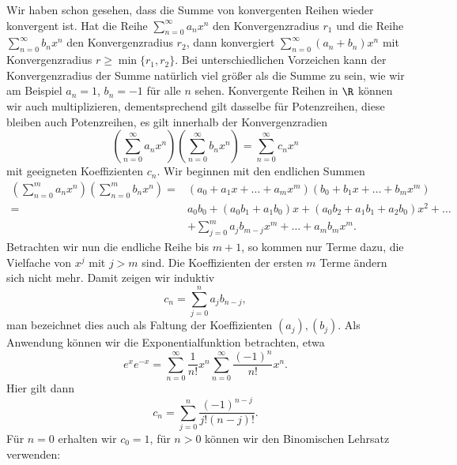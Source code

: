\documentclass[letterpaper,10pt,english]{jupyterBook}
\begin{document}
Wir haben schon gesehen, dass die Summe von konvergenten Reihen wieder konvergent ist. Hat die Reihe \(\sum_{n=0}^\infty a_n x^n\) den Konvergenzradius \(r_1\) und die Reihe  \(\sum_{n=0}^\infty b_n x^n\) den Konvergenzradius \(r_2\), dann konvergiert  \(\sum_{n=0}^\infty (a_n+b_n) x^n\)  mit  Konvergenzradius \(r \geq \min\{r_1,r_2\}.\) Bei unterschiedlichen Vorzeichen kann der Konvergenzradius der Summe natürlich viel größer als die Summe zu sein, wie wir am Beispiel \(a_n = 1\), \(b_n = -1\) für alle \(n\) sehen.
Konvergente Reihen in \(\R\) können wir auch multiplizieren, dementsprechend gilt dasselbe für Potenzreihen, diese bleiben auch Potenzreihen, es gilt innerhalb der Konvergenzradien
\begin{equation*}
 \left( \sum_{n=0}^\infty a_n x^n \right) \left( \sum_{n=0}^\infty b_n x^n \right) = \sum_{n=0}^\infty c_n x^n
\end{equation*}
mit geeigneten Koeffizienten \(c_n\). Wir beginnen mit den endlichen Summen
\begin{align*}\left( \sum_{n=0}^m a_n x^n \right) \left( \sum_{n=0}^m b_n x^n \right) =& (a_0 + a_1x+ \ldots + a_m x^m)(b_0 + b_1x+ \ldots + b_m x^m) \\
=& a_0 b_0 + (a_0b_1+a_1b_0)x + (a_0 b_2 + a_1 b_1 + a_2 b_0)x^2 + \ldots \\ & + \sum_{j=0}^m a_j b_{m-j} x^m + \ldots +a_m b_m x^m .
\end{align*}
Betrachten wir nun die endliche Reihe bis \(m+1\), so kommen nur Terme dazu, die Vielfache von \(x^j\) mit \(j > m\) sind. Die Koeffizienten der ersten \(m\) Terme ändern sich nicht mehr. Damit zeigen wir induktiv
\begin{equation*}
 c_n =  \sum_{j=0}^n a_j b_{n-j}  ,
\end{equation*}
man bezeichnet dies auch als Faltung der Koeffizienten \((a_j), (b_j)\).
Als Anwendung können wir die Exponentialfunktion betrachten, etwa
\begin{equation*}
 e^x e^{-x} = \sum_{n=0}^\infty \frac{1}{n!} x^n  \sum_{n=0}^\infty \frac{(-1)^n}{n!} x^n .
\end{equation*}
Hier gilt  dann
\begin{equation*}
 c_n =  \sum_{j=0}^n \frac{(-1)^{n-j}}{j! (n-j)!} .
\end{equation*}
Für \(n=0\) erhalten wir \(c_0 =1\), für \(n > 0\) können wir den Binomischen Lehrsatz verwenden:
\label{metrik/potenzreihen:lemma-3}
\end{document}

